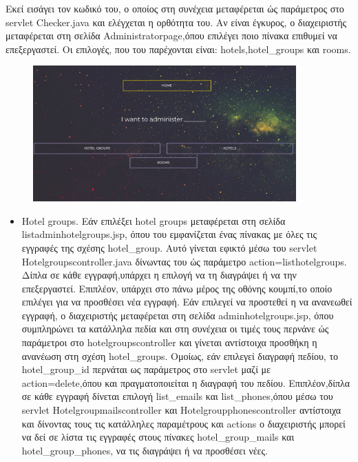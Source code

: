 \documentclass[a4paper,oneside, 11pt]{article}
\begin{document}
\begin{enumerate}
Εκεί εισάγει τον κωδικό του, ο οποίος στη συνέχεια μεταφέρεται ώς παράμετρος στο servlet Checker.java και ελέγχεται η ορθότητα του. Αν είναι έγκυρος, ο διαχειριστής μεταφέρεται στη σελίδα Administratorpage,όπου επιλέγει ποιο πίνακα επιθυμεί να επεξεργαστεί. Οι επιλογές, που του παρέχονται είναι: hotels,hotel\_groups και rooms.

\begin{figure}[h]
\center
\includegraphics[width=0.9\textwidth]{admin.jpg}
\bigbreak
\end{figure}

\begin{itemize}
\item Hotel groups. \bigbreak 
Εάν επιλέξει hotel groups μεταφέρεται στη σελίδα listadminhotelgroups.jsp, όπου του εμφανίζεται ένας πίνακας με όλες τις εγγραφές της σχέσης hotel\_group. Αυτό γίνεται εφικτό μέσω του servlet Hotelgroupscontroller.java δίνωντας του ώς παράμετρο action=listhotelgroups. Δίπλα σε κάθε εγγραφή,υπάρχει η επιλογή να τη διαγράψει ή να την επεξεργαστεί. Eπιπλέον, υπάρχει στο πάνω μέρος της οθόνης κουμπί,το οποίο επιλέγει για να προσθέσει νέα εγγραφή. Εάν επιλεγεί να προστεθεί η να ανανεωθεί εγγραφή, ο διαχειριστής μεταφέρεται στη σελίδα adminhotelgroups.jsp, όπου συμπληρώνει τα κατάλληλα πεδία και στη συνέχεια  οι τιμές τους περνάνε ώς παράμετροι στο hotelgroupscontroller και γίνεται αντίστοιχα προσθήκη η ανανέωση στη σχέση hotel\_groups. Ομοίως, εάν επιλεγεί διαγραφή πεδίου, το hotel\_group\_id περνάται ως παράμετρος στο servlet μαζί με action=delete,όπου και πραγματοποιείται η διαγραφή του πεδίου. \bigbreak 
Επιπλέον,δίπλα σε κάθε εγγραφή δίνεται επιλογή list\_emails και list\_phones,όπου μέσω του servlet Hotelgroupmailscontroller και Hotelgroupphonescontroller αντίστοιχα  και δίνοντας τους τις κατάλληλες παραμέτρους και actions ο διαχειριστής μπορεί να δεί σε λίστα τις εγγραφές στους πίνακες hotel\_group\_mails και hotel\_group\_phones, να τις διαγράψει ή να προσθέσει νέες.


\end{itemize}
\end{enumerate}
\end{document}

